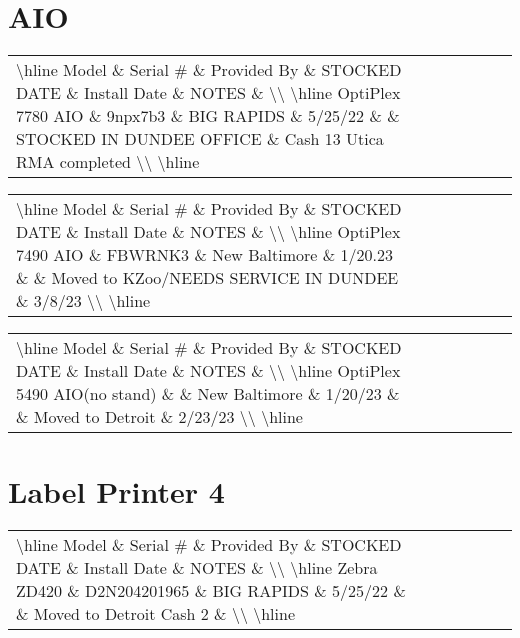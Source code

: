 \documentclass{article}%
\begin{document}
%
\normalsize%
\section{AIO}%
\label{sec:AIO}%
\begin{tabularx}{\textwidth}{|X|X|X|X|X|X|X|}%
\textbackslash{}hline%
Model \& Serial \# \& Provided By \& STOCKED DATE \& Install Date \& NOTES \&  \textbackslash{}\textbackslash{}%
\textbackslash{}hline%
OptiPlex 7780 AIO \& 9npx7b3 \& BIG RAPIDS \& 5/25/22 \&  \& STOCKED IN DUNDEE OFFICE \& Cash 13 Utica RMA completed \textbackslash{}\textbackslash{}%
\textbackslash{}hline%
\end{tabularx}%
\begin{tabularx}{\textwidth}{|X|X|X|X|X|X|X|}%
\textbackslash{}hline%
Model \& Serial \# \& Provided By \& STOCKED DATE \& Install Date \& NOTES \&  \textbackslash{}\textbackslash{}%
\textbackslash{}hline%
OptiPlex 7490 AIO \& FBWRNK3 \& New Baltimore \& 1/20.23 \&  \& Moved to KZoo/NEEDS SERVICE IN DUNDEE \& 3/8/23 \textbackslash{}\textbackslash{}%
\textbackslash{}hline%
\end{tabularx}%
\begin{tabularx}{\textwidth}{|X|X|X|X|X|X|X|}%
\textbackslash{}hline%
Model \& Serial \# \& Provided By \& STOCKED DATE \& Install Date \& NOTES \&  \textbackslash{}\textbackslash{}%
\textbackslash{}hline%
OptiPlex 5490 AIO(no stand) \&  \& New Baltimore \& 1/20/23 \&  \& Moved to Detroit \& 2/23/23 \textbackslash{}\textbackslash{}%
\textbackslash{}hline%
\end{tabularx}

%
\section{Label Printer 4}%
\label{sec:LabelPrinter4}%
\begin{tabularx}{\textwidth}{|X|X|X|X|X|X|X|}%
\textbackslash{}hline%
Model \& Serial \# \& Provided By \& STOCKED DATE \& Install Date \& NOTES \&  \textbackslash{}\textbackslash{}%
\textbackslash{}hline%
Zebra ZD420 \& D2N204201965 \& BIG RAPIDS \& 5/25/22 \&  \& Moved to Detroit Cash 2 \&  \textbackslash{}\textbackslash{}%
\textbackslash{}hline%
\end{tabularx}

%
\end{document}

